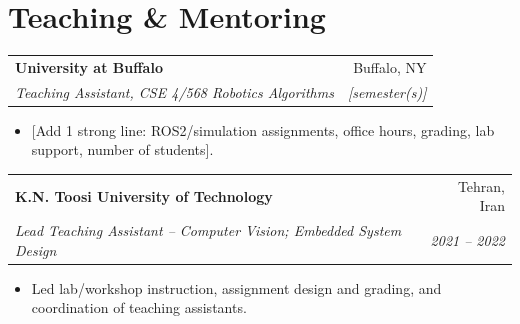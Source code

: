 \documentclass[10.5pt,letterpaper]{article}
\makeatletter
\newcommand{\todo}[1]{\textcolor{placeholder}{[#1]}}
\newcommand{\resumeSubheading}[4]{
  \begin{tabularx}{\textwidth}{@{}Xr@{}}
    \textbf{#1} & #2 \\
    \textit{#3} & \textit{#4}
  \end{tabularx}
  \vspace{-2pt}
}
\newcommand{\resumeProjectHeading}[2]{
  \begin{tabularx}{\textwidth}{@{}Xr@{}}
    \textbf{#1} & #2
  \end{tabularx}
  \vspace{-3pt}
}
\newcommand{\resumeItem}[1]{\item \small #1}
\makeatother
\begin{document}
\section{Teaching \& Mentoring}

\resumeSubheading
{University at Buffalo}{Buffalo, NY}
{Teaching Assistant, CSE 4/568 Robotics Algorithms}{\todo{semester(s)}}
\begin{itemize}
    \resumeItem{\todo{Add 1 strong line: ROS2/simulation assignments, office hours, grading, lab support, number of students}.}
\end{itemize}

\resumeSubheading
{K.N. Toosi University of Technology}{Tehran, Iran}
{Lead Teaching Assistant -- Computer Vision; Embedded System Design}{2021 -- 2022}
\begin{itemize}
    \resumeItem{Led lab/workshop instruction, assignment design and grading, and coordination of teaching assistants.}
\end{itemize}


%
%

\end{document}
